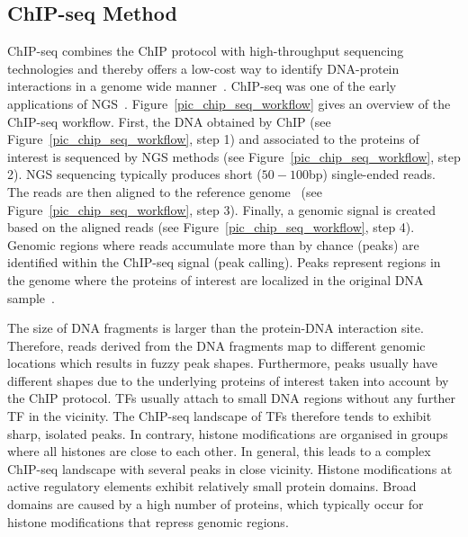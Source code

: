 \subsection{ChIP-seq Method}
\label{sec_chip_seq}
ChIP-seq combines the ChIP protocol with high-throughput sequencing technologies and thereby offers a low-cost way to identify DNA-protein interactions in a genome wide manner~\citep{park2009}. 
ChIP-seq was one of the early applications of NGS~\citep{Johnson2007}.
Figure~\ref{pic_chip_seq_workflow} gives an overview of the ChIP-seq workflow.
First, the DNA obtained by ChIP (see Figure~\ref{pic_chip_seq_workflow}, step 1) and associated to the proteins of interest is sequenced by NGS methods (see Figure~\ref{pic_chip_seq_workflow}, step 2).
NGS sequencing typically produces short (\texttildelow $50-100$bp) single-ended reads.
The reads are then aligned to the reference genome~\citep{park2009} (see Figure~\ref{pic_chip_seq_workflow}, step 3).
Finally, a genomic signal is created based on the aligned reads (see Figure~\ref{pic_chip_seq_workflow}, step 4). 
Genomic regions where reads accumulate more than by chance (peaks) are identified within the ChIP-seq signal (peak calling).
Peaks represent regions in the genome where the proteins of interest are localized in the original DNA sample~\citep{Collas2010}.

The size of DNA fragments is larger than the protein-DNA interaction site. 
Therefore, reads derived from the DNA fragments map to different genomic locations which results in fuzzy peak shapes.
Furthermore, peaks usually have different shapes due to the underlying proteins of interest taken into account by the ChIP protocol.
TFs usually attach to small DNA regions without any further TF in the vicinity.
The ChIP-seq landscape of TFs therefore tends to exhibit sharp, isolated peaks.
In contrary, histone modifications are organised in groups where all histones are close to each other.
In general, this leads to a complex ChIP-seq landscape with several peaks in close vicinity.
Histone modifications at active regulatory elements exhibit relatively small protein domains.
Broad domains are caused by a high number of proteins, which typically occur for histone modifications that repress genomic regions.

